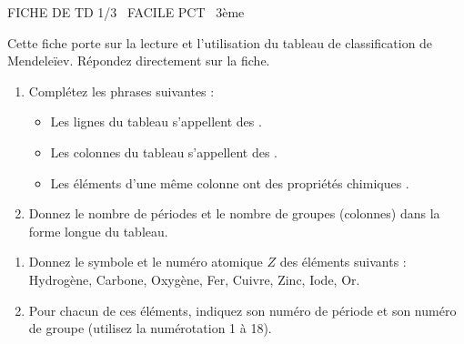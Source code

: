 \documentclass[11pt]{article}
\begin{document}
\begin{tcolorbox}[enhanced,colback=popink,colframe=popink,arc=10pt,boxrule=0pt,left=12pt,right=12pt,top=9pt,bottom=9pt]
{\color{white}\popxbold\small FICHE DE TD 1/3 \textbullet\ FACILE \hfill PCT \textbullet\ 3ème\par}
\end{tcolorbox}
\vspace{4pt}
Cette fiche porte sur la lecture et l'utilisation du tableau de classification de Mendeleïev. Répondez directement sur la fiche.

\begin{exercice}
\begin{enumerate}
    \item Complétez les phrases suivantes :
    \begin{itemize}
        \item Les lignes du tableau s'appellent des \underline{\hspace{4cm}}.
        \item Les colonnes du tableau s'appellent des \underline{\hspace{4cm}}.
        \item Les éléments d'une même colonne ont des propriétés chimiques \underline{\hspace{4cm}}.
    \end{itemize}
    \item Donnez le nombre de périodes et le nombre de groupes (colonnes) dans la forme longue du tableau.
\end{enumerate}
\end{exercice}

\begin{exercice}
\begin{enumerate}
    \item Donnez le symbole et le numéro atomique $Z$ des éléments suivants : Hydrogène, Carbone, Oxygène, Fer, Cuivre, Zinc, Iode, Or.
    \item Pour chacun de ces éléments, indiquez son numéro de période et son numéro de groupe (utilisez la numérotation 1 à 18).
\end{enumerate}
\end{exercice}
\end{document}

